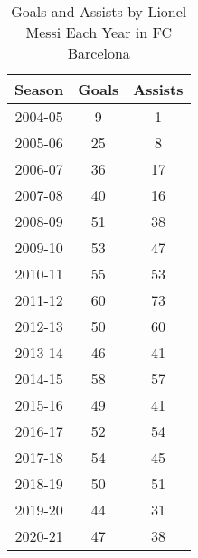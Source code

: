 \begin{table}[h!]
    \centering
    \caption{Goals and Assists by Lionel Messi Each Year in FC Barcelona}
    \begin{tabular}{ccc}
      \hline
      Season & Goals & Assists \\ \hline
      2004-05 & 9 & 1 \\
      2005-06 & 25 & 8 \\
      2006-07 & 36 & 17 \\
      2007-08 & 40 & 16 \\
      2008-09 & 51 & 38 \\
      2009-10 & 53 & 47 \\
      2010-11 & 55 & 53 \\
      2011-12 & 60 & 73 \\
      2012-13 & 50 & 60 \\
      2013-14 & 46 & 41 \\
      2014-15 & 58 & 57 \\
      2015-16 & 49 & 41 \\
      2016-17 & 52 & 54 \\
      2017-18 & 54 & 45 \\
      2018-19 & 50 & 51 \\
      2019-20 & 44 & 31 \\
      2020-21 & 47 & 38 \\
    \hline
    \end{tabular}
    \label{tab:messi_barca_goals_assists}
\end{table}
  